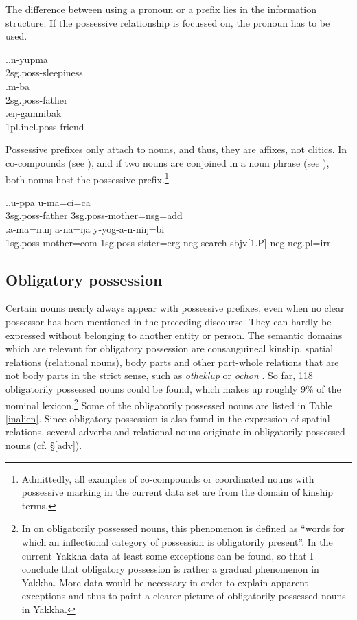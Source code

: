 The difference between using a pronoun or a prefix lies in the information structure. If the possessive relationship is focussed on, the pronoun has to be used.

\ex.\ag.n-yupma\\
{\sc 2sg.poss-}sleepiness\\
\bg.m-ba\\
{\sc 2sg.poss-}father \\
\bg.eŋ-gamnibak\\
{\sc 1pl.incl.poss-}friend \\

Possessive prefixes only attach to nouns, and thus, they are affixes, not clitics. In co-compounds (see \Next[a]), and if two nouns are conjoined in a noun phrase (see \Next[b]), both nouns host the possessive prefix.\footnote{Admittedly, all examples of co-compounds or coordinated nouns with possessive marking in the current data set are from the domain of kinship terms.}

\ex.\ag.u-ppa   u-ma=ci=ca \\
{\sc 3sg.poss-}father {\sc 3sg.poss-}mother{\sc =nsg=add}\\
  
\bg.a-ma=nuŋ                a-na=ŋa                      y-yog-a-n-niŋ=bi\\
{\sc 1sg.poss-}mother{\sc =com} {\sc 1sg.poss-}sister{\sc =erg} {\sc neg-}search{\sc -sbjv[1.P]-neg-neg.pl=irr}\\
  


\subsection{Obligatory  possession}\label{inh-poss}

Certain nouns nearly always  appear with possessive prefixes, even when no clear possessor has been  mentioned in the preceding discourse. They can hardly be expressed without belonging to another entity or person. The semantic domains which are relevant for obligatory possession are consanguineal kinship, spatial relations (relational nouns),  body parts and other part-whole relations that are not body parts in the strict sense, such as \emph{otheklup}  or \emph{ochon} . So far, 118 obligatorily possessed nouns could be found, which makes up roughly 9\% of the nominal lexicon.\footnote{In  \citet[242]{Bickeletal2005_Obligatory} on obligatorily possessed nouns, this phenomenon is defined as “words for which an inflectional category of possession is obligatorily present”. In the current Yakkha data at least some exceptions can be found, so that I conclude that obligatory possession is rather a gradual phenomenon  in Yakkha. More data would be necessary in order to explain apparent exceptions and thus to paint a clearer picture of obligatorily possessed nouns in Yakkha.} Some of the  obligatorily possessed nouns are listed in Table \ref{inalien}. Since obligatory possession is also found in the expression of spatial relations, several adverbs and relational nouns originate in obligatorily possessed nouns (cf. §\ref{adv}).


